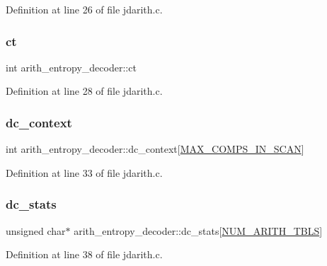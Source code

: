 Definition at line 26 of file jdarith.\+c.

\mbox{\label{structarith__entropy__decoder_a6c907da02b3db27a4b0f025733a44109}} 
\subsubsection{\texorpdfstring{ct}{ct}}
{\footnotesize\ttfamily int arith\+\_\+entropy\+\_\+decoder\+::ct}



Definition at line 28 of file jdarith.\+c.

\mbox{\label{structarith__entropy__decoder_a0b9a2123aec7d879cff09e315530d5e8}} 
\subsubsection{\texorpdfstring{dc\_context}{dc\_context}}
{\footnotesize\ttfamily int arith\+\_\+entropy\+\_\+decoder\+::dc\+\_\+context\mbox{[}\mbox{\hyperlink{jpeglib_8h_adc7013da016c19051dc623fb3d8b35b4}{M\+A\+X\+\_\+\+C\+O\+M\+P\+S\+\_\+\+I\+N\+\_\+\+S\+C\+AN}}\mbox{]}}



Definition at line 33 of file jdarith.\+c.

\mbox{\label{structarith__entropy__decoder_a0a8fd2a17e1e838e9194fab8579463d5}} 
\subsubsection{\texorpdfstring{dc\_stats}{dc\_stats}}
{\footnotesize\ttfamily unsigned char$\ast$ arith\+\_\+entropy\+\_\+decoder\+::dc\+\_\+stats\mbox{[}\mbox{\hyperlink{jpeglib_8h_a4efb0fccc8d9db72ca18f32a26fad6ab}{N\+U\+M\+\_\+\+A\+R\+I\+T\+H\+\_\+\+T\+B\+LS}}\mbox{]}}



Definition at line 38 of file jdarith.\+c.

